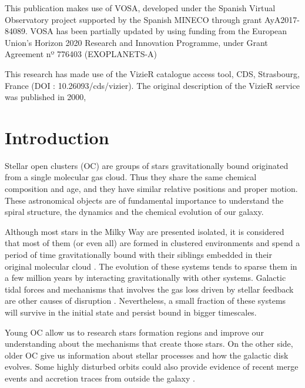 \documentclass[11pt, a4paper, english]{book}
\begin{document}
\medskip

This publication makes use of VOSA, developed under the Spanish Virtual Observatory project
supported by the Spanish MINECO through grant AyA2017-84089.
VOSA has been partially updated by using funding from the European Union's Horizon 2020 Research
and Innovation Programme, under Grant Agreement nº 776403 (EXOPLANETS-A)

\medskip

This research has made use of the VizieR catalogue access tool, CDS, Strasbourg, France (DOI : 10.26093/cds/vizier).
The original description of the VizieR service was published in 2000, \cite[A\&AS 143, 23]{ochsenbein2000vizier}

\mainmatter
\chapter{Introduction}

Stellar open clusters (OC) \cite[]{janes1982open} are groups of stars gravitationally bound originated from a single molecular gas cloud.
Thus they share the same chemical composition and age, and they have similar relative positions and proper motion.
These astronomical objects are of fundamental importance to understand the spiral structure,
the dynamics and the chemical evolution of our galaxy.

Although most stars in the Milky Way are presented isolated, it is considered that most of them (or even all)
are formed in clustered environments and spend a period of time gravitationally bound with their siblings embedded
in their original molecular cloud
\cite[]{clarke2000theformationofstellarclusters} \cite[]{portegies2010young}.
The evolution of these systems tends to sparse them in a few million years by interacting gravitationally with other systems.
Galactic tidal forces and mechanisms that involves the gas loss driven by stellar feedback are other causes of disruption
\cite[]{brinkmann2017bound}.
Nevertheless, a small fraction of these systems will survive in the initial state and persist bound in bigger timescales.

Young OC allow us to research stars formation regions and improve our understanding about the mechanisms that create those stars.
On the other side, older OC give us information about stellar processes and how the galactic disk evolves.
Some highly disturbed orbits could also provide evidence of recent merge events and accretion traces from outside the galaxy
\cite[]{cantat2016abundances}.
\end{document}
